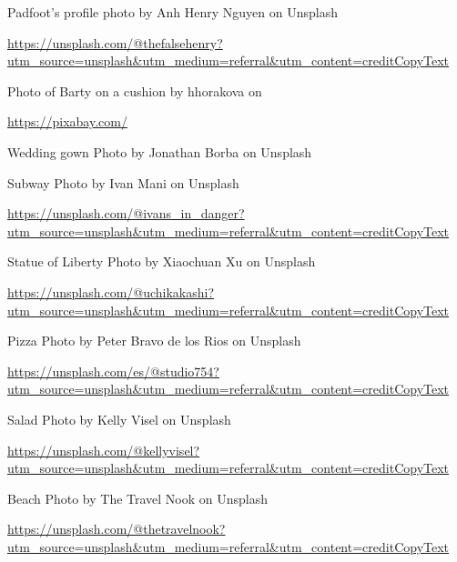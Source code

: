 \documentclass[12pt,twoside,openright]{memoir}
\begin{document}
Padfoot's profile photo by Anh Henry Nguyen on Unsplash

\href{https://unsplash.com/@thefalsehenry?utm_source=unsplash&utm_medium=referral&utm_content=creditCopyText}{\url{https://unsplash.com/@thefalsehenry?utm_source=unsplash&utm_medium=referral&utm_content=creditCopyText}}


Photo of Barty on a cushion by hhorakova on

\href{https://pixabay.com/}{\url{https://pixabay.com/}}

Wedding gown Photo by Jonathan Borba on Unsplash

Subway Photo by Ivan Mani on Unsplash

\href{https://unsplash.com/@ivans_in_danger?utm_source=unsplash&utm_medium=referral&utm_content=creditCopyText}{\url{https://unsplash.com/@ivans_in_danger?utm_source=unsplash&utm_medium=referral&utm_content=creditCopyText}}


Statue of Liberty Photo by Xiaochuan Xu on Unsplash

\href{https://unsplash.com/@uchikakashi?utm_source=unsplash&utm_medium=referral&utm_content=creditCopyText}{\url{https://unsplash.com/@uchikakashi?utm_source=unsplash&utm_medium=referral&utm_content=creditCopyText}}

Pizza Photo by Peter Bravo de los Rios on Unsplash

\href{https://unsplash.com/es/@studio754?utm_source=unsplash&utm_medium=referral&utm_content=creditCopyText}{\url{https://unsplash.com/es/@studio754?utm_source=unsplash&utm_medium=referral&utm_content=creditCopyText}}

Salad Photo by Kelly Visel on Unsplash

\href{https://unsplash.com/@kellyvisel?utm_source=unsplash&utm_medium=referral&utm_content=creditCopyText}{\url{https://unsplash.com/@kellyvisel?utm_source=unsplash&utm_medium=referral&utm_content=creditCopyText}}


Beach Photo by The Travel Nook on Unsplash

\href{https://unsplash.com/@thetravelnook?utm_source=unsplash&utm_medium=referral&utm_content=creditCopyText}{\url{https://unsplash.com/@thetravelnook?utm_source=unsplash&utm_medium=referral&utm_content=creditCopyText}}
\end{document}
